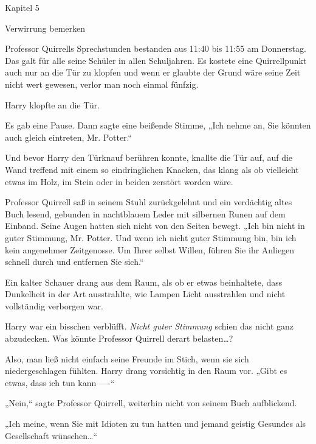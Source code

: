 

\hypertarget{verwirrung-bemerken}{%

Kapitel 5

Verwirrung bemerken

Professor Quirrells Sprechstunden bestanden aus 11:40 bis 11:55 am Donnerstag. Das galt für alle seine Schüler in allen Schuljahren. Es kostete eine Quirrellpunkt auch nur an die Tür zu klopfen und wenn er glaubte der Grund wäre seine Zeit nicht wert gewesen, verlor man noch einmal fünfzig.

Harry klopfte an die Tür.

Es gab eine Pause. Dann sagte eine beißende Stimme, „Ich nehme an, Sie könnten auch gleich eintreten, Mr. Potter.“

Und bevor Harry den Türknauf berühren konnte, knallte die Tür auf, auf die Wand treffend mit einem so eindringlichen Knacken, das klang als ob vielleicht etwas im Holz, im Stein oder in beiden zerstört worden wäre.

Professor Quirrell saß in seinem Stuhl zurückgelehnt und ein verdächtig altes Buch lesend, gebunden in nachtblauem Leder mit silbernen Runen auf dem Einband. Seine Augen hatten sich nicht von den Seiten bewegt. „Ich bin nicht in guter Stimmung, Mr. Potter. Und wenn ich nicht guter Stimmung bin, bin ich kein angenehmer Zeitgenosse. Um Ihrer selbst Willen, führen Sie ihr Anliegen schnell durch und entfernen Sie sich.“

Ein kalter Schauer drang aus dem Raum, als ob er etwas beinhaltete, dass Dunkelheit in der Art ausstrahlte, wie Lampen Licht ausstrahlen und nicht vollständig verborgen war.

Harry war ein bisschen verblüfft. \emph{Nicht guter Stimmung} schien das nicht ganz abzudecken. Was könnte Professor Quirrell derart belasten…?

Also, man ließ nicht einfach seine Freunde im Stich, wenn sie sich niedergeschlagen fühlten. Harry drang vorsichtig in den Raum vor. „Gibt es etwas, dass ich tun kann ----“

„Nein,“ sagte Professor Quirrell, weiterhin nicht von seinem Buch aufblickend.

„Ich meine, wenn Sie mit Idioten zu tun hatten und jemand geistig Gesundes als Gesellschaft wünschen…“

}
